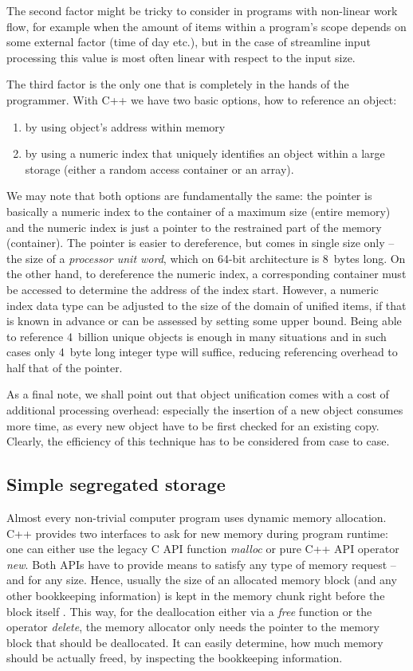The second factor might be tricky to consider in programs with non-linear work flow,
for example when the amount of items within a program's scope depends on some external
factor (time of day etc.), but in the case of streamline input processing this value is
most often linear with respect to the input size.

The third factor is the only one that is completely in the hands of the programmer.
With C++ we have two basic options, how to reference an object:
\begin{enumerate}
  \item by using object's address within memory
  \item by using a numeric index that uniquely identifies an object within a large storage
  (either a random access container or an array).
\end{enumerate}

We may note that both options are fundamentally the same:
the pointer is basically a numeric index to the container of a maximum size (entire memory)
and the numeric index is just a pointer to the restrained part of the memory (container).
The pointer is easier to dereference, but comes in single size only -- the size of
a \emph{processor unit word}, which on 64-bit architecture is 8~bytes long.
On the other hand, to dereference the numeric index, a corresponding container must be
accessed to determine the address of the index start.
However, a numeric index data type can be adjusted to the size of the domain of unified items,
if that is known in advance or can be assessed by setting some upper bound.
Being able to reference 4~billion unique objects is enough in many situations and
in such cases only 4~byte long integer type will suffice, reducing referencing overhead
to half that of the pointer.

As a final note, we shall point out that object unification comes with a cost of
additional processing overhead: especially the insertion of a new object consumes more time,
as every new object have to be first checked for an existing copy.
Clearly, the efficiency of this technique has to be considered from case to case.

\subsection{Simple segregated storage}
\label{sec:simple-segregated-storage}

Almost every non-trivial computer program uses dynamic memory allocation.
C++ provides two interfaces to ask for new memory during program runtime:
one can either use the legacy C API function \emph{malloc} or pure C++ API operator \emph{new}.
Both APIs have to provide means to satisfy any type of memory request -- and for any size.
Hence, usually the size of an allocated memory block (and any other bookkeeping information) is
kept in the memory chunk right before the block itself \citep[Item 10]{meyers:effective-cpp}.
This way, for the deallocation either via a \emph{free} function or the operator \emph{delete},
the memory allocator only needs the pointer to the memory block that should be deallocated.
It can easily determine, how much memory should be actually freed, by inspecting the
bookkeeping information.

